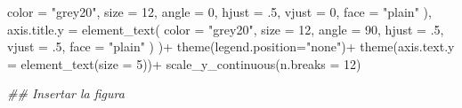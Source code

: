 \documentclass[
  12pt,
  letterpaper,
]{book}
\newenvironment{Shaded}{\begin{snugshade}}{\end{snugshade}}
\newcommand{\AttributeTok}[1]{\textcolor[rgb]{0.40,0.45,0.13}{#1}}
\newcommand{\DecValTok}[1]{\textcolor[rgb]{0.68,0.00,0.00}{#1}}
\newcommand{\DocumentationTok}[1]{\textcolor[rgb]{0.37,0.37,0.37}{\textit{#1}}}
\newcommand{\FunctionTok}[1]{\textcolor[rgb]{0.28,0.35,0.67}{#1}}
\newcommand{\NormalTok}[1]{\textcolor[rgb]{0.00,0.23,0.31}{#1}}
\newcommand{\SpecialCharTok}[1]{\textcolor[rgb]{0.37,0.37,0.37}{#1}}
\newcommand{\StringTok}[1]{\textcolor[rgb]{0.13,0.47,0.30}{#1}}
\begin{document}
\begin{Shaded}
\begin{Highlighting}[]
      \AttributeTok{color =} \StringTok{"grey20"}\NormalTok{,}
      \AttributeTok{size =} \DecValTok{12}\NormalTok{,}
      \AttributeTok{angle =} \DecValTok{0}\NormalTok{,}
      \AttributeTok{hjust =}\NormalTok{ .}\DecValTok{5}\NormalTok{,}
      \AttributeTok{vjust =} \DecValTok{0}\NormalTok{,}
      \AttributeTok{face =} \StringTok{"plain"}
\NormalTok{    ),}
    \AttributeTok{axis.title.y =} \FunctionTok{element\_text}\NormalTok{(}
      \AttributeTok{color =} \StringTok{"grey20"}\NormalTok{,}
      \AttributeTok{size =} \DecValTok{12}\NormalTok{,}
      \AttributeTok{angle =} \DecValTok{90}\NormalTok{,}
      \AttributeTok{hjust =}\NormalTok{ .}\DecValTok{5}\NormalTok{,}
      \AttributeTok{vjust =}\NormalTok{ .}\DecValTok{5}\NormalTok{,}
      \AttributeTok{face =} \StringTok{"plain"}
\NormalTok{    )}
\NormalTok{  )}\SpecialCharTok{+}
  \FunctionTok{theme}\NormalTok{(}\AttributeTok{legend.position=}\StringTok{"none"}\NormalTok{)}\SpecialCharTok{+}
  \FunctionTok{theme}\NormalTok{(}\AttributeTok{axis.text.y =} \FunctionTok{element\_text}\NormalTok{(}\AttributeTok{size =} \DecValTok{5}\NormalTok{))}\SpecialCharTok{+}
  \FunctionTok{scale\_y\_continuous}\NormalTok{(}\AttributeTok{n.breaks =} \DecValTok{12}\NormalTok{)}

\DocumentationTok{\#\# Insertar la figura }


\end{Highlighting}
\end{Shaded}
\end{document}
